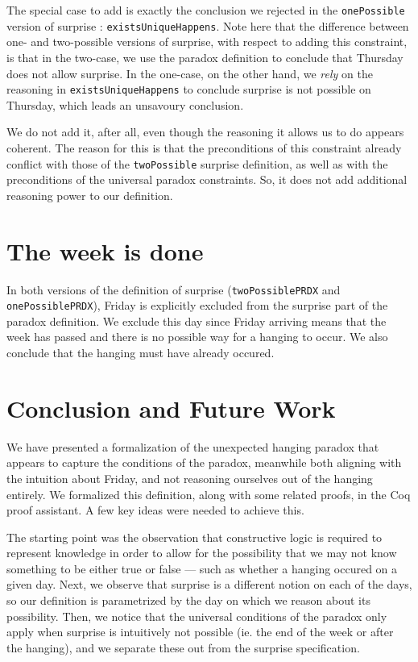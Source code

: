\documentclass[journal]{journal}
\begin{document}
The special case to add is exactly the conclusion we rejected in the {\tt onePossible}
version of surprise : {\tt existsUniqueHappens}. Note here that
the difference between one- and two-possible versions of surprise, with respect
to adding this constraint,
is that in the two-case, we use the paradox definition to conclude that Thursday
does not allow surprise. In the one-case, on the other hand, we \emph{rely} on the reasoning in
{\tt existsUniqueHappens} to conclude surprise is not possible on Thursday,
which leads an unsavoury conclusion.

We do not add it, after all, even though the reasoning it allows us to do
appears coherent. The reason for this is that the preconditions of this
constraint already conflict with those of the {\tt twoPossible} surprise definition, as well
as with the preconditions of the universal paradox constraints. So, it does not
add additional reasoning power to our definition.

\section{The week is done }
\label{sec:friday}

In both versions of the definition of surprise ({\tt twoPossiblePRDX} and
{\tt onePossiblePRDX}), Friday is explicitly excluded from the surprise
part of the paradox definition.
We exclude this day since Friday arriving means that the
week has passed and there is no possible way for a hanging to occur. We also
conclude that the hanging must have already occured.

\section{Conclusion and Future Work}

We have presented a formalization of the unexpected hanging paradox that appears to capture the
conditions of the paradox, meanwhile both aligning with the
intuition about Friday, and not reasoning ourselves out of the hanging entirely.
We formalized this definition, along with some related proofs, in the Coq
proof assistant.
A few key ideas were needed to achieve this.

The starting point was the observation that constructive logic
is required to represent knowledge in order to allow for the possibility that we
may not know something to be either true or false --- such as whether a hanging
occured on a given day. Next, we observe that surprise is a different notion
on each of the days, so our definition is parametrized by the day on which
we reason about its possibility. Then, we notice that the universal conditions of the
paradox only apply when surprise is intuitively not possible (ie. the end of the
week or after the hanging), and we separate these out from the surprise specification.
\end{document}

